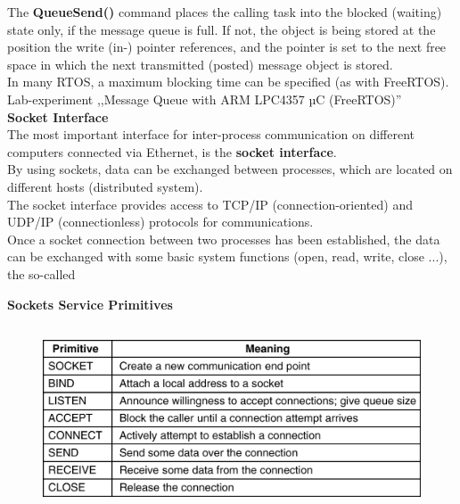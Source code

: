 The \textbf{QueueSend()} command places the calling task into the blocked (waiting) state only, if the message queue is full. If not, the object is being stored at the position the write (in-) pointer references, and the pointer is set to the next free space in which the next transmitted (posted) message object is stored.\\

In many RTOS, a maximum blocking time can be specified (as with FreeRTOS).\\

Lab-experiment ,,Message Queue with ARM LPC4357 µC (FreeRTOS)''\\

{\rot\bf Socket Interface}\\

The most important interface for inter-process communication on different computers connected via Ethernet, is the \textbf{socket interface}.\\

By using sockets, data can be exchanged between processes, which are located on different hosts (distributed system). \\

The socket interface provides access to TCP/IP (connection-oriented) and UDP/IP (connectionless) protocols for communications. \\

Once a socket connection between two processes has been established, the data can be exchanged with some basic system functions (open, read, write, close ...), the so-called \\
\newpage

\textbf{Sockets Service Primitives}

 	\begin{figure}[h]
    \centering
    \includegraphics[width=12cm, height=5.5cm]{Images/image19.png}
    \label{fig:Fig }
    \end{figure}
    

